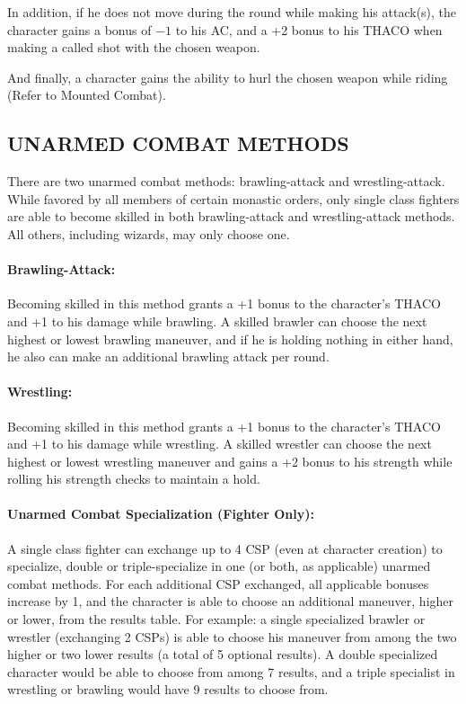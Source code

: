 \begin{multicols}{2}
In addition, if he does not move during the round while making his attack(s), the character gains a bonus of $-1$ to his AC, and a +2 bonus to his THACO when making a called shot with the chosen weapon.

And finally, a character gains the ability to hurl the chosen weapon while riding (Refer to Mounted Combat).

\subsection{UNARMED COMBAT METHODS}

There are two unarmed combat methods: brawling-attack and wrestling-attack.  While favored by all members of certain monastic orders, only single class fighters are able to become skilled in both brawling-attack and wrestling-attack methods.  All others, including wizards, may only choose one.  

\paragraph{Brawling-Attack:} Becoming skilled in this method grants a +1 bonus to the character's THACO and +1 to his damage while brawling.  A skilled brawler can choose the next highest or lowest brawling maneuver, and if he is holding nothing in either hand, he also can make an additional brawling attack per round.    

\paragraph{Wrestling:} Becoming skilled in this method grants a +1 bonus to the character's THACO and +1 to his damage while wrestling.  A skilled wrestler can choose the next highest or lowest wrestling maneuver and gains a +2 bonus to his strength while rolling his strength checks to maintain a hold.

\paragraph{Unarmed Combat Specialization (Fighter Only):} A single class fighter can exchange up to 4 CSP (even at character creation) to specialize, double or triple-specialize in one (or both, as applicable) unarmed combat methods.  For each additional CSP exchanged, all applicable bonuses increase by 1, and the character is able to choose an additional maneuver, higher or lower, from the results table.  For example: a single specialized brawler or wrestler (exchanging 2 CSPs) is able to choose his maneuver from among the two higher or two lower results (a total of 5 optional results).  A double specialized character would be able to choose from among 7 results, and a triple specialist in wrestling or brawling would have 9 results to choose from.  

\end{multicols}

